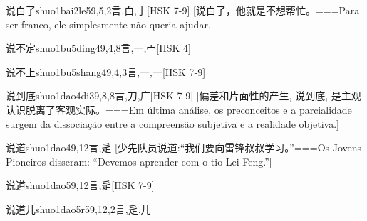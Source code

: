 \begin{EntryWithPhonetic}{说白了}{shuo1bai2le5}{9,5,2}{⾔,⽩,⼅}[HSK 7-9]
  [说白了，他就是不想帮忙。===Para ser franco, ele simplesmente não queria ajudar.]
\end{EntryWithPhonetic}

\begin{EntryWithPhonetic}{说不定}{shuo1bu5ding4}{9,4,8}{⾔,⼀,⼧}[HSK 4]
\end{EntryWithPhonetic}

\begin{EntryWithPhonetic}{说不上}{shuo1bu5shang4}{9,4,3}{⾔,⼀,⼀}[HSK 7-9]
\end{EntryWithPhonetic}

\begin{EntryWithPhonetic}{说到底}{shuo1dao4di3}{9,8,8}{⾔,⼑,⼴}[HSK 7-9]
  [偏差和片面性的产生, 说到底, 是主观认识脱离了客观实际。===Em última análise, os preconceitos e a parcialidade surgem da dissociação entre a compreensão subjetiva e a realidade objetiva.]
\end{EntryWithPhonetic}

\begin{EntryWithPhonetic}{说道}{shuo1dao4}{9,12}{⾔,⾡}
  [少先队员说道:``我们要向雷锋叔叔学习。''===Os Jovens Pioneiros disseram: ``Devemos aprender com o tio Lei Feng.'']
\end{EntryWithPhonetic}

\begin{EntryWithPhonetic}{说道}{shuo1dao5}{9,12}{⾔,⾡}[HSK 7-9]
\end{EntryWithPhonetic}

\begin{EntryWithPhonetic}{说道儿}{shuo1dao5r5}{9,12,2}{⾔,⾡,⼉}
\end{EntryWithPhonetic}

